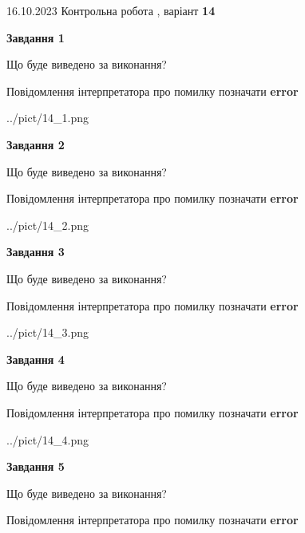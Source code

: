 \documentclass[12pt, ukrainian]{article}
\begin{document}
{\Large{16.10.2023 Контрольна робота , варіант  \No \textbf { 14 }\par}}
{
\begin {large}
{\begin {center}\textbf{Завдання 1}\end {center}}\par
Що буде виведено за виконання? \par
Повідомлення інтерпретатора про помилку позначати \textbf{error}

\begin{center}
	{../pict/14_1.png}
\end{center}
\newpage

{\begin {center}\textbf{Завдання 2}\end {center}}\par
Що буде виведено за виконання? \par
Повідомлення інтерпретатора про помилку позначати \textbf{error}

\begin{center}
	{../pict/14_2.png}
\end{center}
\newpage

{\begin {center}\textbf{Завдання 3}\end {center}}\par
Що буде виведено за виконання? \par
Повідомлення інтерпретатора про помилку позначати \textbf{error}

\begin{center}
	{../pict/14_3.png}
\end{center}
\newpage

{\begin {center}\textbf{Завдання 4}\end {center}}\par
Що буде виведено за виконання? \par
Повідомлення інтерпретатора про помилку позначати \textbf{error}

\begin{center}
	{../pict/14_4.png}
\end{center}
\newpage

{\begin {center}\textbf{Завдання 5}\end {center}}\par
Що буде виведено за виконання? \par
Повідомлення інтерпретатора про помилку позначати \textbf{error}


\end{large}}
\end{document}
